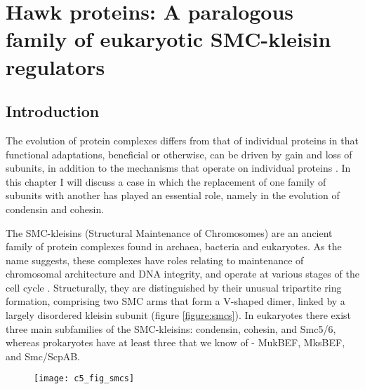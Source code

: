 \documentclass[a4paper,11pt,twoside,openright]{scrbook}
\begin{document}
\chapter{Hawk proteins: A paralogous family of eukaryotic SMC-kleisin regulators} \label{chapter:hawks}

\section{Introduction}
The evolution of protein complexes differs from that of individual proteins in
that functional adaptations, beneficial or otherwise, can be driven by gain and
loss of subunits, in addition to the mechanisms that operate on individual
proteins \cite{Gabaldon2005,Huynen2013,Marsh2015}. In this chapter I will
discuss a case in which the replacement of one family of subunits with another
has played an essential role, namely in the evolution of condensin and cohesin.

The SMC-kleisins (Structural Maintenance of Chromosomes) are an ancient family
of protein complexes found in archaea, bacteria and eukaryotes. As the name
suggests, these complexes have roles relating to maintenance of chromosomal
architecture and DNA integrity, and operate at various stages of the cell cycle
\cite{Nasmyth2009, Hirano2016}. Structurally, they are distinguished by their
unusual tripartite ring formation, comprising two SMC arms that form a V-shaped
dimer, linked by a largely disordered kleisin subunit (figure
\ref{figure:smcs}). In eukaryotes there exist three main subfamilies of the
SMC-kleisins: condensin, cohesin, and Smc5/6, whereas prokaryotes have at least
three that we know of - MukBEF, MksBEF, and Smc/ScpAB.

\begin{figure}[h]  {\texttt{[image: c5\_fig\_smcs]}}
\end{figure}
\end{document}
